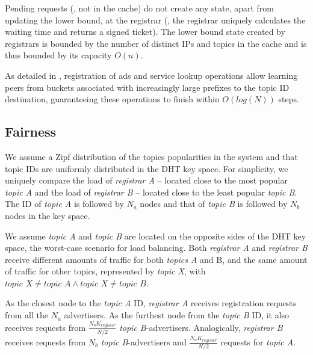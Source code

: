 Pending requests (\ie, not in the cache) do not create any state, apart from updating the lower bound, at the registrar (\ie, the registrar uniquely calculates the waiting time and returns a signed ticket). The lower bound state created by registrars is bounded by the number of distinct IPs and topics in the cache and is thus bounded by its capacity $O(n)$. 

As detailed in , registration of ads and service lookup operations allow learning peers from buckets associated with increasingly large prefixes to the topic ID destination, guaranteeing these operations to finish within $O(log(N))$ steps.

\subsection{Fairness}
We assume a Zipf distribution of the topics popularities
in the system and that topic IDs are uniformly distributed in the DHT key space.
For simplicity, we uniquely compare the load of \emph{registrar A} -- located close to the most popular \emph{topic A} and the load of \emph{registrar B} -- located close to the least popular \emph{topic B}.
The ID of \emph{topic A} is followed by $N_a$ nodes and that of \emph{topic B} is followed by $N_b$ nodes in the key space.

We assume \emph{topic A} and \emph{topic B} are located on the opposite sides of the DHT key space, the worst-case scenario for load balancing.
Both \emph{registrar A} and \emph{registrar B} receive different amounts of traffic for both \emph{topics A} and {B}, and the same amount of traffic for other topics, represented by \emph{topic X}, with $\textit{topic X} \neq \textit{topic A} \wedge \textit{topic X} \neq \textit{topic B}$. 

As the closest node to the \emph{topic A} ID, \emph{registrar A} receives registration requests from all the $N_a$ advertisers.
As the furthest node from the \emph{topic B} ID, it also receives requests from $\frac{N_{b}K_\textit{register}}{N/2}$ \emph{topic B}-advertisers.
Analogically, \emph{registrar B} receives requests from $N_b$ \emph{topic B}-advertisers and $\frac{N_{a}K_\textit{register}}{N/2}$ requests for \emph{topic A}.

